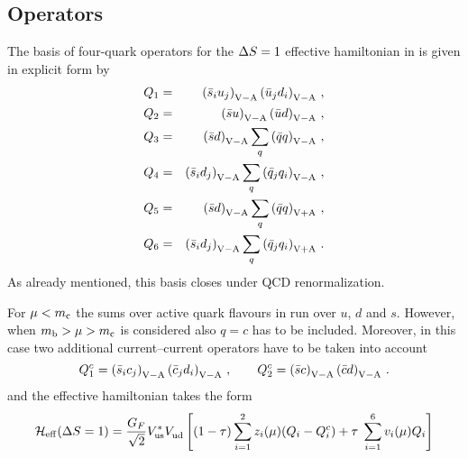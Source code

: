 \subsection{Operators}
            \label{sec:HeffdF1:66:op}
The basis of four-quark operators for the $\Delta S=1$ effective hamiltonian
in  is given in explicit form by
\begin{eqnarray}
Q_{1} & = & \left( \bar s_{i} u_{j}  \right)_{\rm V-A}
            \left( \bar u_{j}  d_{i} \right)_{\rm V-A}
\, , \nonumber \\
Q_{2} & = & \left( \bar s u \right)_{\rm V-A}
            \left( \bar u d \right)_{\rm V-A}
\, , \nonumber \\
Q_{3} & = & \left( \bar s d \right)_{\rm V-A}
   \sum_{q} \left( \bar q q \right)_{\rm V-A}
\, , \label{eq:Kppbasis} \\
Q_{4} & = & \left( \bar s_{i} d_{j}  \right)_{\rm V-A}
   \sum_{q} \left( \bar q_{j}  q_{i} \right)_{\rm V-A}
\, , \nonumber \\
Q_{5} & = & \left( \bar s d \right)_{\rm V-A}
   \sum_{q} \left( \bar q q \right)_{\rm V+A}
\, , \nonumber \\
Q_{6} & = & \left( \bar s_{i} d_{j}  \right)_{\rm V-A}
   \sum_{q} \left( \bar q_{j}  q_{i} \right)_{\rm V+A}
\, . \nonumber
\end{eqnarray}
As already mentioned, this basis closes under QCD renormalization.  

For $\mu < m_{\rm c}$ the sums over active quark flavours in 
run over $u$, $d$ and $s$.  However, when  $m_{\rm b} > \mu > m_{\rm c}$ is
considered also $q=c$ has to be included. Moreover, in this case two
additional current--current operators have to be taken into account
\begin{equation}
Q_1^c = \left(\bar s_i c_j  \right)_{\rm V-A}
        \left(\bar c_j  d_i \right)_{\rm V-A}
\, , \qquad
Q_2^c = \left(\bar s c \right)_{\rm V-A}
        \left(\bar c d \right)_{\rm V-A} \, .
\label{eq:KppQ12c}
\end{equation}
and the effective hamiltonian takes the form
\begin{equation}
{\cal H}_{\rm eff}(\Delta S=1) = \frac{G_F}{\sqrt{2}} V_{\rm us}^* V_{\rm ud}^{} 
\left[(1-\tau) \sum_{i=1}^{2} z_i(\mu) (Q_i-Q^c_i) +
\tau \; \sum_{i=1}^{6} v_i(\mu)  Q_i \right]
\label{eq:HeffKppc}
\end{equation}

